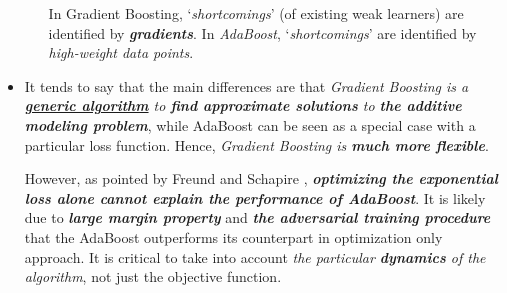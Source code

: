 \documentclass[11pt]{article}
\begin{document}
\begin{itemize}
\begin{enumerate}
In Gradient Boosting, `\emph{shortcomings}' (of existing weak learners) are identified by \emph{\textbf{gradients}}. In \emph{AdaBoost}, `\emph{shortcomings}' are identified by \emph{high-weight data points}.
\end{enumerate}

\item It tends to say that the main differences are that \emph{Gradient Boosting is a \underline{\textbf{generic algorithm}} to \textbf{find approximate solutions} to \textbf{the additive modeling problem}}, while AdaBoost can be seen as a special case with a particular loss function. Hence, \emph{Gradient Boosting is \textbf{much more flexible}}.

However, as pointed by Freund and Schapire \citep{schapire2012boosting}, \emph{\textbf{optimizing the exponential loss alone cannot explain the performance of AdaBoost}}. It is likely due to \emph{\textbf{large margin property}} and \emph{\textbf{the adversarial training procedure}} that the AdaBoost outperforms its counterpart in optimization only approach. It is critical to take into account \emph{the particular \textbf{dynamics} of the algorithm}, not just the objective function.
\end{itemize}
\end{document}
